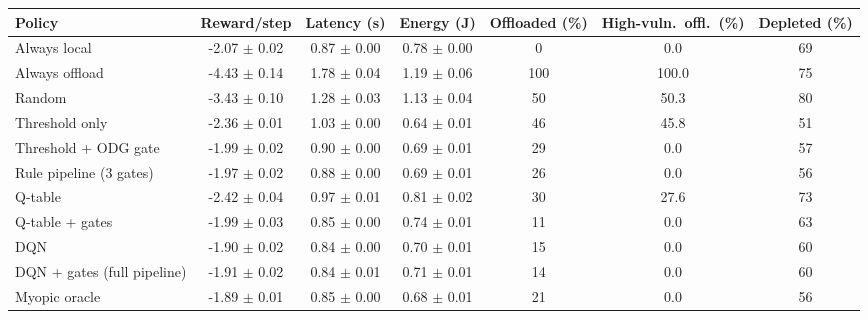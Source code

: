 \begin{tabular}{@{}lcccccc@{}}
\toprule
Policy & Reward/step & Latency (s) & Energy (J) & Offloaded (\%) & High-vuln.\ offl.\ (\%) & Depleted (\%) \\
\midrule
Always local & -2.07 $\pm$ 0.02 & 0.87 $\pm$ 0.00 & 0.78 $\pm$ 0.00 & 0 & 0.0 & 69 \\
Always offload & -4.43 $\pm$ 0.14 & 1.78 $\pm$ 0.04 & 1.19 $\pm$ 0.06 & 100 & 100.0 & 75 \\
Random & -3.43 $\pm$ 0.10 & 1.28 $\pm$ 0.03 & 1.13 $\pm$ 0.04 & 50 & 50.3 & 80 \\
Threshold only & -2.36 $\pm$ 0.01 & 1.03 $\pm$ 0.00 & 0.64 $\pm$ 0.01 & 46 & 45.8 & 51 \\
Threshold + ODG gate & -1.99 $\pm$ 0.02 & 0.90 $\pm$ 0.00 & 0.69 $\pm$ 0.01 & 29 & 0.0 & 57 \\
Rule pipeline (3 gates) & -1.97 $\pm$ 0.02 & 0.88 $\pm$ 0.00 & 0.69 $\pm$ 0.01 & 26 & 0.0 & 56 \\
Q-table & -2.42 $\pm$ 0.04 & 0.97 $\pm$ 0.01 & 0.81 $\pm$ 0.02 & 30 & 27.6 & 73 \\
Q-table + gates & -1.99 $\pm$ 0.03 & 0.85 $\pm$ 0.00 & 0.74 $\pm$ 0.01 & 11 & 0.0 & 63 \\
DQN & -1.90 $\pm$ 0.02 & 0.84 $\pm$ 0.00 & 0.70 $\pm$ 0.01 & 15 & 0.0 & 60 \\
DQN + gates (full pipeline) & -1.91 $\pm$ 0.02 & 0.84 $\pm$ 0.01 & 0.71 $\pm$ 0.01 & 14 & 0.0 & 60 \\
Myopic oracle & -1.89 $\pm$ 0.01 & 0.85 $\pm$ 0.00 & 0.68 $\pm$ 0.01 & 21 & 0.0 & 56 \\
\bottomrule
\end{tabular}
